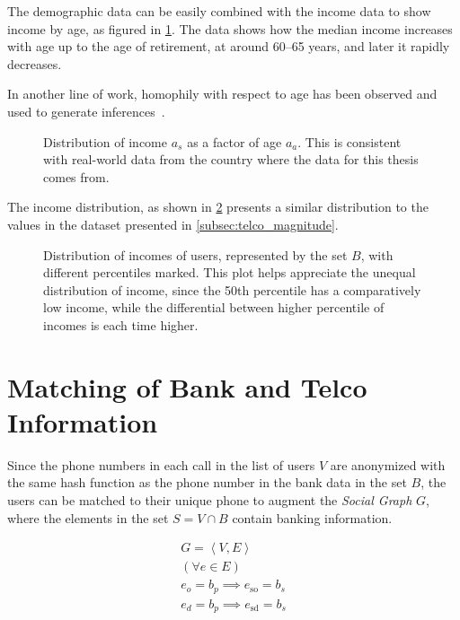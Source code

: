 The demographic data can be easily combined with the income data to show income by age, as figured in \cref{fig:income_age_boxplot}. The data shows how the median income increases with age up to the age of retirement, at around 60--65 years, and later it rapidly decreases.

In another line of work, homophily with respect to age has been observed and used to generate inferences~\cite{brea2014}.

\begin{figure}
\centering
{}
\caption{Distribution of income $a_s$ as a factor of age $a_a$. This is consistent with real-world data from the country where the data for this thesis comes from.}
\label{fig:income_age_boxplot}
\end{figure}

The income distribution, as shown in \cref{fig:incomedistribution} presents a similar distribution to the values in the dataset presented in \cref{subsec:telco_magnitude}.

\begin{figure}
\centering
{}
\caption{Distribution of incomes of users, represented by the set $B$, with different percentiles marked. This plot helps appreciate the unequal distribution of income, since the 50th percentile has a comparatively low income, while the differential between higher percentile of incomes is each time higher.}
\label{fig:incomedistribution}
\end{figure}

\section{Matching of Bank and Telco Information}
\label{subsec:banktencomathing}

Since the phone numbers in each call in the list of users $V$ are anonymized with the same hash function as the phone number in the bank data in the set $B$, the users can be matched to their unique phone to augment the \emph{Social Graph} $G$, where the elements in the set $S = V \cap B$ contain banking information.

\begin{equation}
\label{eq:banktelcojoin}
\begin{gathered}
G = \left< V, E \right> \\
( \forall e \in E ) \\
e_o = b_p \implies e_{\operatorname{so}} = b_s \\
e_d = b_p \implies e_{\operatorname{sd}} = b_s \\
\end{gathered}
\end{equation}

